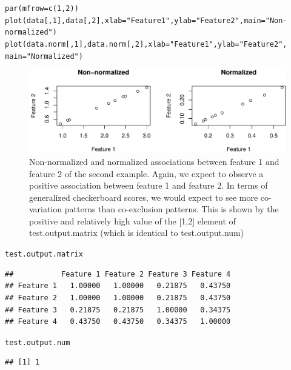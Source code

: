 \documentclass{article}\usepackage[]{graphicx}\usepackage[usenames,dvipsnames]{color}
\makeatletter
\def\maxwidth{ %
  \ifdim\Gin@nat@width>\linewidth
    \linewidth
  \else
    \Gin@nat@width
  \fi
}
\newcommand{\hlnum}[1]{\textcolor[rgb]{0.816,0.125,0.439}{#1}}%
\newcommand{\hlstr}[1]{\textcolor[rgb]{0.251,0.627,0.251}{#1}}%
\newcommand{\hlstd}[1]{\textcolor[rgb]{0.251,0.251,0.251}{#1}}%
\newcommand{\hlkwc}[1]{\textcolor[rgb]{0.251,0.251,0.251}{#1}}%
\newcommand{\hlkwd}[1]{\textcolor[rgb]{0.878,0.439,0.125}{#1}}%
\newenvironment{knitrout}{}{} %
\makeatother
\begin{document}
\begin{knitrout}
\color{fgcolor}\begin{kframe}
\begin{alltt}
\hlkwd{par}\hlstd{(}\hlkwc{mfrow}\hlstd{=}\hlkwd{c}\hlstd{(}\hlnum{1}\hlstd{,} \hlnum{2}\hlstd{))}
\hlkwd{plot}\hlstd{(data[,}\hlnum{1}\hlstd{],data[,}\hlnum{2}\hlstd{],}\hlkwc{xlab}\hlstd{=}\hlstr{"Feature 1"}\hlstd{,}\hlkwc{ylab}\hlstd{=}\hlstr{"Feature 2"}\hlstd{,}\hlkwc{main}\hlstd{=}\hlstr{"Non-normalized"}\hlstd{)}
\hlkwd{plot}\hlstd{(data.norm[,}\hlnum{1}\hlstd{],data.norm[,}\hlnum{2}\hlstd{],}\hlkwc{xlab}\hlstd{=}\hlstr{"Feature 1"}\hlstd{,}\hlkwc{ylab}\hlstd{=}\hlstr{"Feature 2"}\hlstd{,}
     \hlkwc{main}\hlstd{=}\hlstr{"Normalized"}\hlstd{)}
\end{alltt}
\end{kframe}\begin{figure}[H]
\includegraphics[width=\maxwidth]{figure/unnamed-chunk-14-1} \caption{Non-normalized and normalized associations between feature 1 and feature 2 of the second example.  Again, we expect to observe a positive association between feature 1 and feature 2.  In terms of generalized checkerboard scores, we would expect to see more co-variation patterns than co-exclusion patterns.  This is shown by the positive and relatively high value of the [1,2] element of test.output.matrix (which is identical to test.output.num)}\label{fig:unnamed-chunk-14}
\end{figure}
\begin{kframe}\begin{alltt}
\hlstd{test.output.matrix}
\end{alltt}
\begin{verbatim}
##           Feature 1 Feature 2 Feature 3 Feature 4
## Feature 1   1.00000   1.00000   0.21875   0.43750
## Feature 2   1.00000   1.00000   0.21875   0.43750
## Feature 3   0.21875   0.21875   1.00000   0.34375
## Feature 4   0.43750   0.43750   0.34375   1.00000
\end{verbatim}
\begin{alltt}
\hlstd{test.output.num}
\end{alltt}
\begin{verbatim}
## [1] 1
\end{verbatim}
\end{kframe}
\end{knitrout}
\end{document}
